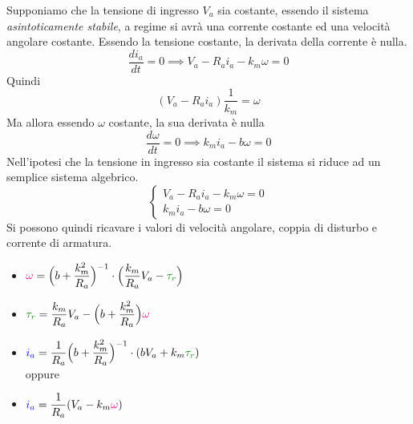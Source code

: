 \documentclass[10pt, letterpaper]{report}
\begin{document}
Supponiamo che la tensione di ingresso $V_a$ sia costante, essendo il sistema  \textit{asintoticamente stabile}, a regime si avrà una corrente costante ed una velocità angolare costante. Essendo la tensione costante, la derivata della corrente è nulla.
$$ \dfrac{di_a}{dt}=0\implies V_a-R_ai_a-k_m\omega = 0$$
Quindi 
$$(V_a-R_ai_a)\frac{1}{k_m}=\omega$$
Ma allora essendo $\omega$ costante, la sua derivata è nulla 
$$ \dfrac{d\omega}{dt}=0\implies k_mi_a-b\omega = 0$$
Nell'ipotesi che la tensione in ingresso sia costante il sistema si riduce ad un semplice sistema algebrico. 
$$\begin{cases}
    V_a-R_ai_a-k_m\omega = 0\\
    k_mi_a-b\omega = 0
\end{cases} $$
Si possono quindi ricavare i valori di velocità angolare, coppia di disturbo e corrente di armatura. \begin{itemize}
    \item $\displaystyle \color{magenta}\omega\color{black} = \Big(b+\frac{k_m^2}{R_a}\Big)^{-1}\cdot\Big(\frac{k_m}{R_a}V_a-\color{darkgreen}\tau_r\color{black}\Big)$
    

    \item $\displaystyle \color{darkgreen}\tau_r\color{black}=\frac{k_m}{R_a}V_a-\Big(b+\frac{k_m^2}{R_a}\Big)\displaystyle \color{magenta}\omega\color{black}$
    \item $\displaystyle \color{blue}i_a\color{black}= 
    \frac{1}{R_a}\Big(b+\frac{k_m^2}{R_a}\Big)^{-1}\cdot (bV_a+k_m\displaystyle \color{darkgreen}\tau_r\color{black})
    $ \\ oppure
    \item $\displaystyle \color{blue}i_a\color{black}= \frac{1}{R_a}(V_a-k_m\color{magenta}\omega\color{black})$
\end{itemize}
\end{document}
